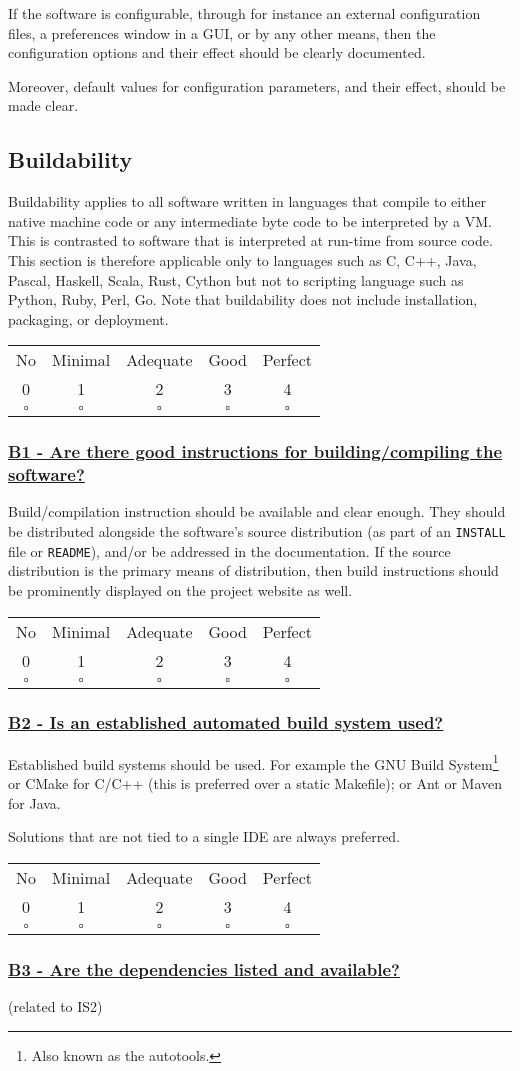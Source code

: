 \documentclass[a4paper,11pt]{article}
\newcommand{\criterion}[2]{\subsubsection*{\underline{#1 - #2}}\label{id:#1}}
\newcommand\CheckTable{%
  \begin{tabular}{ccccc}
    No & Minimal & Adequate & Good & Perfect \\
    0 & 1 & 2 & 3 & 4 \\
    \hline
    $\square$ & $\square$ & $\square$ & $\square$ & $\square$ \\
  \end{tabular}%
}
\begin{document}
If the software is configurable, through for instance an external configuration
files, a preferences window in a GUI, or by any other means, then the
configuration options and their effect should be clearly documented.

Moreover, default values for configuration parameters, and their effect, should be
made clear.

\subsection{Buildability}\label{sec:bui}

Buildability applies to all software written in languages that compile to
either native machine code or any intermediate byte code to be interpreted by a VM.
This is contrasted to software that is interpreted at run-time from source
code. This section is therefore applicable only to languages such as C, C++,
Java, Pascal, Haskell, Scala, Rust, Cython but not to scripting language such
as Python, Ruby, Perl, Go.  Note that buildability does not include
installation, packaging, or deployment.

\CheckTable

\newcommand{\bOneID}{B1}
\newcommand{\bOneText}{Are there good instructions for building/compiling the software?}
\criterion{\bOneID}{\bOneText}

Build/compilation instruction should be available and clear enough. They should
be distributed alongside the software's source distribution (as part of an
\texttt{INSTALL} file or \texttt{README}), and/or be addressed in the documentation. If the
source distribution is the primary means of distribution, then build
instructions should be prominently displayed on the project website as well.

\CheckTable

\newcommand{\bTwoID}{B2}
\newcommand{\bTwoText}{Is an established automated build system used?}
\criterion{\bTwoID}{\bTwoText}

Established build systems should be used. For example the GNU Build
System\footnote{Also known as the autotools.} or CMake for C/C++ (this is
preferred over a static Makefile); or Ant or Maven for Java. 

Solutions that are not tied to a single IDE are always preferred.

\CheckTable

\newcommand{\bThreeID}{B3}
\newcommand{\bThreeText}{Are the dependencies listed and available?}
\criterion{\bThreeID}{\bThreeText}
(related to IS2)
\end{document}

